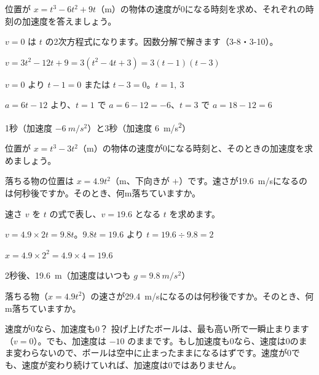 \begin{reidai}
位置が $x=t^3-6t^2+9t$（m）の物体の速度が0になる時刻を求め、それぞれの時刻の加速度を答えましょう。\par
\kangaekata $v=0$ は $t$ の2次方程式になります。因数分解で解きます（3-8・3-10）。\par
\shiki $v=3t^2-12t+9=3(t^2-4t+3)=3(t-1)(t-3)$\par
\hspace*{2.6\zw}$v=0$ より $t-1=0$ または $t-3=0$。$t=1,\ 3$\par
\hspace*{2.6\zw}$a=6t-12$ より、$t=1$ で $a=6-12=-6$、$t=3$ で $a=18-12=6$\par
\kotae 1秒（加速度 $\qty{-6}{m/s^2}$）と3秒（加速度 \qty{6}{m/s^2}）
\end{reidai}

\begin{jibun}
位置が $x=t^3-3t^2$（m）の物体の速度が0になる時刻と、そのときの加速度を求めましょう。
\end{jibun}

\begin{reidai}[落ちる物の速さ]
落ちる物の位置は $x=4.9t^2$（m、下向きが $+$）です。速さが\qty{19.6}{m/s}になるのは何秒後ですか。そのとき、何m落ちていますか。\par
\kangaekata 速さ $v$ を $t$ の式で表し、$v=19.6$ となる $t$ を求めます。\par
\shiki $v=4.9\times2t=9.8t$。$9.8t=19.6$ より $t=19.6\div9.8=2$\par
\hspace*{2.6\zw}$x=4.9\times2^2=4.9\times4=19.6$\par
\kotae 2秒後、\qty{19.6}{m}（加速度はいつも $g=\qty{9.8}{m/s^2}$）
\end{reidai}

\begin{jibun}
落ちる物（$x=4.9t^2$）の速さが\qty{29.4}{m/s}になるのは何秒後ですか。そのとき、何m落ちていますか。
\end{jibun}


\begin{tsumazuki}{速度が0なら、加速度も0？}
投げ上げたボールは、最も高い所で一瞬止まります（$v=0$）。でも、加速度は $-10$ のままです。もし加速度も0なら、速度は0のまま変わらないので、ボールは空中に止まったままになるはずです。速度が0でも、速度が変わり続けていれば、加速度は0ではありません。
\end{tsumazuki}

